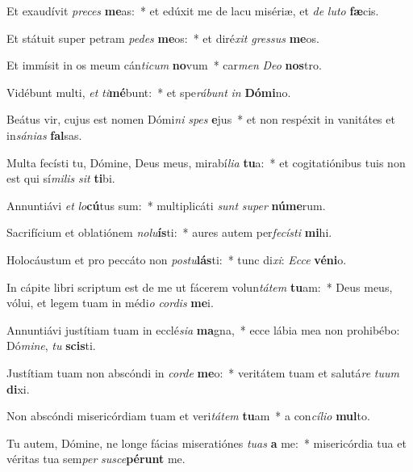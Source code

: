 \item Et exaudívit \textit{pre}\textit{ces} \textbf{me}as:~* et edúxit me de lacu misériæ, et \textit{de} \textit{lu}\textit{to} \textbf{fæ}cis.
\item Et státuit super petram \textit{pe}\textit{des} \textbf{me}os:~* et diré\textit{xit} \textit{gres}\textit{sus} \textbf{me}os.
\item Et immísit in os meum cán\textit{ti}\textit{cum} \textbf{no}vum~* car\textit{men} \textit{De}\textit{o} \textbf{nos}tro.
\item Vidébunt multi, \textit{et} \textit{ti}\textbf{mé}bunt:~* et spe\textit{rá}\textit{bunt} \textit{in} \textbf{Dó}\textbf{mi}no.
\item Beátus vir, cujus est nomen Dómi\textit{ni} \textit{spes} \textbf{e}jus~* et non respéxit in vanitátes et in\textit{sá}\textit{ni}\textit{as} \textbf{fal}sas.
\item Multa fecísti tu, Dómine, Deus meus, mirabí\textit{li}\textit{a} \textbf{tu}a:~* et cogitatiónibus tuis non est qui sí\textit{mi}\textit{lis} \textit{sit} \textbf{ti}bi.
\item Annuntiávi \textit{et} \textit{lo}\textbf{cú}tus sum:~* multiplicáti \textit{sunt} \textit{su}\textit{per} \textbf{nú}\textbf{me}rum.
\item Sacrifícium et oblatiónem \textit{no}\textit{lu}\textbf{ís}ti:~* aures autem per\textit{fe}\textit{cís}\textit{ti} \textbf{mi}hi.
\item Holocáustum et pro peccáto non \textit{pos}\textit{tu}\textbf{lás}ti:~* tunc di\textit{xi}: \textit{Ec}\textit{ce} \textbf{vé}\textbf{ni}o.
\item In cápite libri scriptum est de me ut fácerem volun\textit{tá}\textit{tem} \textbf{tu}am:~* Deus meus, vólui, et legem tuam in médi\textit{o} \textit{cor}\textit{dis} \textbf{me}i.
\item Annuntiávi justítiam tuam in ecclé\textit{si}\textit{a} \textbf{ma}gna,~* ecce lábia mea non prohibébo: Dó\textit{mi}\textit{ne}, \textit{tu} \textbf{scis}ti.
\item Justítiam tuam non abscóndi in \textit{cor}\textit{de} \textbf{me}o:~* veritátem tuam et salutá\textit{re} \textit{tu}\textit{um} \textbf{di}xi.
\item Non abscóndi misericórdiam tuam et veri\textit{tá}\textit{tem} \textbf{tu}am~* a con\textit{cí}\textit{li}\textit{o} \textbf{mul}to.
\item Tu autem, Dómine, ne longe fácias miseratiónes \textit{tu}\textit{as} \textbf{a} me:~* misericórdia tua et véritas tua sem\textit{per} \textit{su}\textit{sce}\textbf{pé}\textbf{runt} me.
